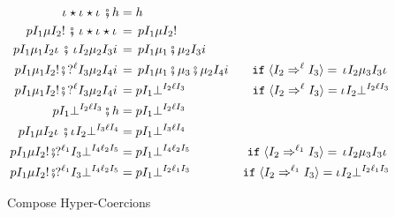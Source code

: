 \documentclass[acmtog, authorversion, acmlarge]{acmart}
\begin{document}
\begin{figure}[tbh]
  \begin{subfigure}{.5\textwidth}
    \begin{align*}
      \cmp{\hc{\pmt}{\Dyn}{\id}{\Dyn}{\imt}}{\HC} &= \HC \\
      \cmp{\hc{\Prj}{\I_1}{\Med}{\I_2}{\inj}} %
          {\hc{\pmt}{\Dyn}{\id}{\Dyn}{\imt}} %
      &=  \hc{\Prj}{\I_1}{\Med}{\I_2}{\inj} \\
      \cmp{\hc{\Prj}{\I_1}{\Med_1}{\I_2}{\imt}} %
          {\hc{\pmt}{\I_2}{\Med_2}{\I_3}{\Inj}} %
      &=  \hc{\Prj}{\I_1}{\cmpm{\Med_1}{\Med_2}}{\I_3}{\Inj} \\
      \cmp{\hc{\Prj}{\I_1}{\Med_1}{\I_2}{\inj}} %
          {\hc{\prj{\Lbl}}{\I_3}{\Med_2}{\I_4}{\Inj}} %
      &=  \hc{\Prj}{\I_1}{\cmpm{\cmpm{\Med_1}{\Med_3}}{\Med_2}}{\I_4}{\Inj} %
          & \texttt{if} \;
          \mkcrcn{\I_2}{\I_3} = \hc{\pmt}{\I_2}{\Med_3}{\I_3}{\imt}   \\
          \cmp{\hc{\Prj}{\I_1}{\Med_1}{\I_2}{\inj}} %
          {\hc{\prj{\Lbl}}{\I_3}{\Med_2}{\I_4}{\Inj}} %
      &= \hcfail{\Prj}{\I_1}{\I_2}{\Lbl}{\I_3} %
          & \texttt{if} \;
          \mkcrcn{\I_2}{\I_3} = \hcfail{\pmt}{\I_2}{\I_2}{\Lbl}{\I_3}   \\
      \cmp{\hcfail{\Prj}{\I_1}{\I_2}{\Lbl}{\I_3}} %
          {\HC} %
      &=  \hcfail{\Prj}{\I_1}{\I_2}{\Lbl}{\I_3} \\
      \cmp{\hc{\Prj}{\I_1}{\Med}{\I_2}{\imt}} %
          {\hcfail{\pmt}{\I_2}{\I_3}{\Lbl}{\I_4}} %
      &=  \hcfail{\Prj}{\I_1}{\I_3}{\Lbl}{\I_4} \\
      \cmp{\hc{\Prj}{\I_1}{\Med}{\I_2}{\inj}} %
          {\hcfail{\prj{\Lbl_1}}{\I_3}{\I_4}{\Lbl_2}{\I_5}} %
      &=  \hcfail{\Prj}{\I_1}{\I_4}{\Lbl_2}{\I_5} %
          & \texttt{if} \;
          \mkcrcn[\Lbl_1]{\I_2}{\I_3} = \hc{\pmt}{\I_2}{\Med_3}{\I_3}{\imt} \\
      \cmp{\hc{\Prj}{\I_1}{\Med}{\I_2}{\inj}} %
          {\hcfail{\prj{\Lbl_1}}{\I_3}{\I_4}{\Lbl_2}{\I_5}} %
      &=  \hcfail{\Prj}{\I_1}{\I_2}{\Lbl_1}{\I_3} %
          & \texttt{if} \;
          \mkcrcn[\Lbl_1]{\I_2}{\I_3} = \hcfail{\pmt}{\I_2}{\I_2}{\Lbl_1}{\I_3}
    \end{align*}
    \caption{Compose Hyper-Coercions}
    \label{fig:hcCompose}
  \end{subfigure}%
  \begin{subfigure}{.5\textwidth}

\end{subfigure}
\end{figure}
\end{document}
